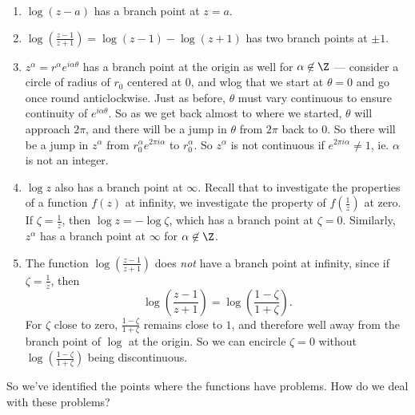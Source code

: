 \documentclass[a4paper]{article}
\begin{document}
\begin{eg}\leavevmode
  \begin{enumerate}
    \item $\log (z - a)$ has a branch point at $z = a$.
    \item $\log\left(\frac{z - 1}{z + 1}\right) = \log(z - 1) - \log(z + 1)$ has two branch points at $\pm 1$.
    \item $z^\alpha = r^\alpha e^{i\alpha \theta}$ has a branch point at the origin as well for $\alpha \not\in \Z$ --- consider a circle of radius of $r_0$ centered at $0$, and wlog that we start at $\theta = 0$ and go once round anticlockwise. Just as before, $\theta$ must vary continuous to ensure continuity of $e^{i\alpha \theta}$. So as we get back almost to where we started, $\theta$ will approach $2\pi$, and there will be a jump in $\theta$ from $2\pi$ back to $0$. So there will be a jump in $z^\alpha$ from $r_0^{\alpha} e^{2\pi i \alpha}$ to $r_0^\alpha$. So $z^\alpha$ is not continuous if $e^{2\pi i \alpha} \not= 1$, ie. $\alpha$ is not an integer.
    \item $\log z$ also has a branch point at $\infty$. Recall that to investigate the properties of a function $f(z)$ at infinity, we investigate the property of $f\left(\frac{1}{z}\right)$ at zero. If $\zeta = \frac{1}{z}$, then $\log z = - \log \zeta$, which has a branch point at $\zeta = 0$. Similarly, $z^{\alpha}$ has a branch point at $\infty$ for $\alpha \not\in \Z$.
    \item The function $\log\left(\frac{z - 1}{z + 1}\right)$ does \emph{not} have a branch point at infinity, since if $\zeta = \frac{1}{z}$, then
      \[
        \log\left(\frac{z - 1}{z + 1}\right) = \log\left(\frac{1 - \zeta}{1 + \zeta}\right).
      \]
      For $\zeta$ close to zero, $\frac{1 - \zeta}{1 + \zeta}$ remains close to $1$, and therefore well away from the branch point of $\log$ at the origin. So we can encircle $\zeta = 0$ without $\log\left(\frac{1 - \zeta}{1 + \zeta}\right)$ being discontinuous.
  \end{enumerate}
\end{eg}
So we've identified the points where the functions have problems. How do we deal with these problems?
\end{document}
